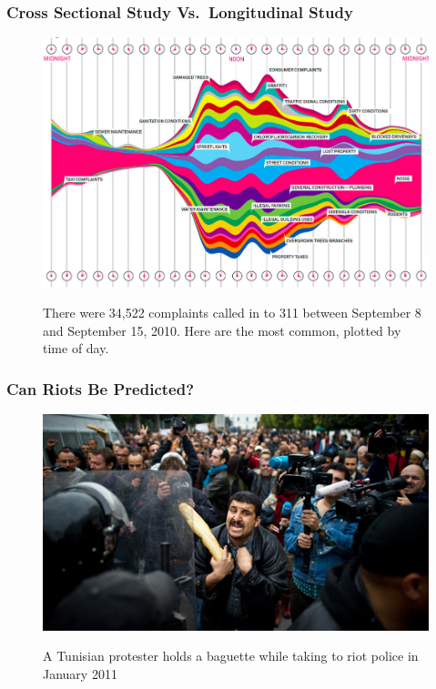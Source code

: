 \documentclass[hyperref={colorlinks=false},handout,10pt]{beamer}
\begin{document}
\begin{frame}
    \frametitle{Cross Sectional Study Vs.\ Longitudinal Study}
    \begin{figure}
        \centering
            \href{http://www.wired.com/magazine/2010/11/ff_311_new_york/all/}{ \includegraphics[scale=0.3]{images/311callvolume.png}}
            \caption{There were 34,522 complaints called in to 311 between September 8 and September 15, 2010. Here are the most common, plotted by time of day.}
    \end{figure}
\end{frame}

\begin{frame}
    \frametitle{Can Riots Be Predicted?}
    \begin{figure}
        \caption{A Tunisian protester holds a baguette while taking to riot police in January 2011}
        \begin{center}
            \href{http://www.npr.org/blogs/thesalt/2012/09/20/161501075/high-food-prices-forcast-more-global-riots-ahead-researchers-say}{\includegraphics[width=\textwidth]{images/food_riot.jpg}}
        \end{center}  
    \end{figure}
\end{frame}
\end{document}
